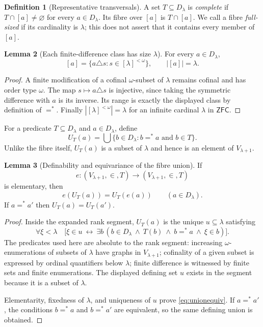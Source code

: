 \documentclass[11pt,letterpaper]{article}
\theoremstyle{definition}
\newtheorem{definition}{Definition}[section]
\newtheorem{lemma}[definition]{Lemma}
\numberwithin{equation}{section}
\newcommand{\ZFC}{\mathsf{ZFC}}
\newcommand{\Efin}{\mathrel{=^*}}
\begin{document}
\begin{definition}[Representative transversals]
A set $T\subseteq D_\lambda$ is \emph{complete} if $T\cap[a]\ne\varnothing$ for every $a\in D_\lambda$. Its fibre over $[a]$ is $T\cap[a]$. We call a fibre \emph{full-sized} if its cardinality is $\lambda$; this does not assert that it contains every member of $[a]$.
\end{definition}

\begin{lemma}[Each finite-difference class has size $\lambda$]\label{lem:classsize}
For every $a\in D_\lambda$,
\[
 [a]=\{a\triangle s:s\in[\lambda]^{<\omega}\},\qquad |[a]|=\lambda.
\]
\end{lemma}

\begin{proof}
A finite modification of a cofinal $\omega$-subset of $\lambda$ remains cofinal and has order type $\omega$. The map $s\mapsto a\triangle s$ is injective, since taking the symmetric difference with $a$ is its inverse. Its range is exactly the displayed class by definition of $\Efin$. Finally $|[\lambda]^{<\omega}|=\lambda$ for an infinite cardinal $\lambda$ in $\ZFC$.
\end{proof}

For a predicate $T\subseteq D_\lambda$ and $a\in D_\lambda$, define
\begin{equation}\label{eq:fibreunion}
 U_T(a)=\bigcup\{b\in D_\lambda:b\Efin a\text{ and }b\in T\}.
\end{equation}
Unlike the fibre itself, $U_T(a)$ is a subset of $\lambda$ and hence is an element of $V_{\lambda+1}$.

\begin{lemma}[Definability and equivariance of the fibre union]\label{lem:union}
If
\[
 e:(V_{\lambda+1},\in,T)\longrightarrow(V_{\lambda+1},\in,T)
\]
is elementary, then
\begin{equation}\label{eq:unionequiv}
 e(U_T(a))=U_T(e(a))\qquad(a\in D_\lambda).
\end{equation}
If $a\Efin a'$ then $U_T(a)=U_T(a')$.
\end{lemma}

\begin{proof}
Inside the expanded rank segment, $U_T(a)$ is the unique $u\subseteq\lambda$ satisfying
\[
 \forall\xi<\lambda\quad
 \bigl[\xi\in u\ \longleftrightarrow\
   \exists b\,(b\in D_\lambda\ \wedge\ T(b)\ \wedge\ b\Efin a
                                      \ \wedge\ \xi\in b)\bigr].
\]
The predicates used here are absolute to the rank segment: increasing $\omega$-enumerations of subsets of $\lambda$ have graphs in $V_{\lambda+1}$; cofinality of a given subset is expressed by ordinal quantifiers below $\lambda$; finite difference is witnessed by finite sets and finite enumerations. The displayed defining set $u$ exists in the segment because it is a subset of $\lambda$.

Elementarity, fixedness of $\lambda$, and uniqueness of $u$ prove \eqref{eq:unionequiv}. If $a\Efin a'$, the conditions $b\Efin a$ and $b\Efin a'$ are equivalent, so the same defining union is obtained.
\end{proof}
\end{document}
